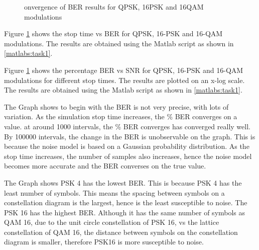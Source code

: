 \begin{figure}[ht!]
    \begin{center}
        
        \caption{onvergence of BER results for QPSK, 16PSK and 16QAM modulations}
    \end{center} \label{fig:1}
\end{figure}



Figure \ref{fig:1} shows the stop time vs BER for QPSK, 16-PSK and 16-QAM modulations. The results are obtained using the Matlab script as shown in \ref{matlabs:task1}.


Figure \ref{fig:1} shows the percentage BER vs SNR for QPSK, 16-PSK and 16-QAM modulations for different stop times. The results are plotted on an x-log scale. The results are obtained using the Matlab script as shown in \ref{matlabs:task1}. 

The Graph shows to begin with the BER is not very precise, with lots of variation. As the simulation stop time increases, the \% BER converges on a value. at around 1000 intervals, the \% BER converges has converged really well. By 100000 intervals, the change in the BER is unobservable on the graph. This is because the noise model is based on a Gaussian probability distribution. As the stop time increases, the number of samples also increases, hence the noise model becomes more accurate and the BER converses on the true value.

The Graph shows PSK 4 has the lowest BER. This is because PSK 4 has the least number of symbols. This means the spacing between symbols on a constellation diagram is the largest, hence is the least susceptible to noise. The PSK 16 has the highest BER. Although it has the same number of symbols as QAM 16, due to the unit circle constellation of PSK 16, vs the lattice constellation of QAM 16, the distance between symbols on the constellation diagram is smaller, therefore PSK16 is more susceptible to noise.


